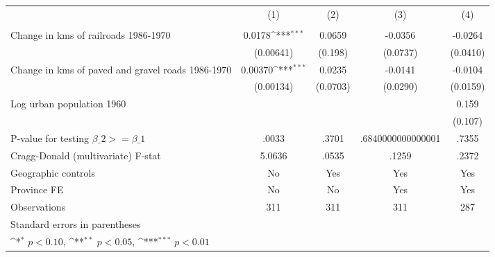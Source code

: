 {
\def\sym#1{\ifmmode^{#1}\else\(^{#1}\)\fi}
\begin{tabular}{l*{4}{c}}
\hline\hline
                &\multicolumn{1}{c}{(1)}&\multicolumn{1}{c}{(2)}&\multicolumn{1}{c}{(3)}&\multicolumn{1}{c}{(4)}\\
                &\multicolumn{1}{c}{}&\multicolumn{1}{c}{}&\multicolumn{1}{c}{}&\multicolumn{1}{c}{}\\
\hline
Change in kms of railroads 1986-1970&   0.0178\sym{***}&   0.0659         &  -0.0356         &  -0.0264         \\
                &(0.00641)         &  (0.198)         & (0.0737)         & (0.0410)         \\
[1em]
Change in kms of paved and gravel roads 1986-1970&  0.00370\sym{***}&   0.0235         &  -0.0141         &  -0.0104         \\
                &(0.00134)         & (0.0703)         & (0.0290)         & (0.0159)         \\
[1em]
Log urban population 1960&                  &                  &                  &    0.159         \\
                &                  &                  &                  &  (0.107)         \\
\hline
P-value for testing $\beta\_{2} >= \beta\_{1}$&    .0033         &    .3701         &.6840000000000001         &    .7355         \\
Cragg-Donald (multivariate) F-stat&   5.0636         &    .0535         &    .1259         &    .2372         \\
Geographic controls&       No         &      Yes         &      Yes         &      Yes         \\
Province FE     &       No         &       No         &      Yes         &      Yes         \\
Observations    &      311         &      311         &      311         &      287         \\
\hline\hline
\multicolumn{5}{l}{\footnotesize Standard errors in parentheses}\\
\multicolumn{5}{l}{\footnotesize \sym{*} \(p<0.10\), \sym{**} \(p<0.05\), \sym{***} \(p<0.01\)}\\
\end{tabular}
}
